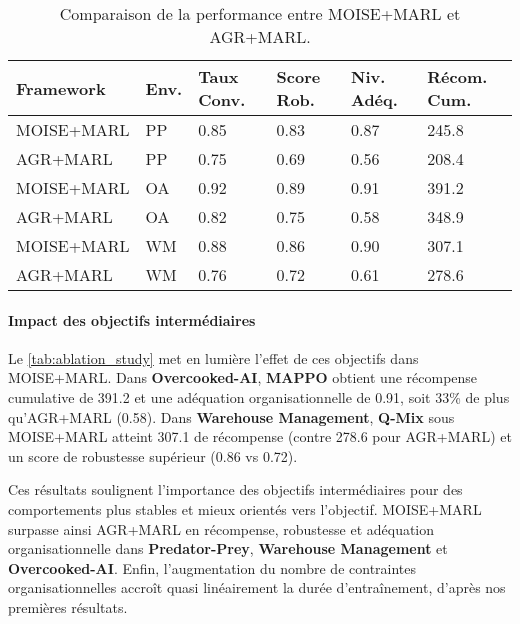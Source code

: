 \documentclass[final]{jfsma}
\begin{document}
\begin{table}[h!]
  \centering
  \caption{Comparaison de la performance entre MOISE+MARL et AGR+MARL.}
  \label{tab:ablation_study}
  \footnotesize
  \renewcommand{\arraystretch}{1.1}
  \begin{tabular}{p{2.1cm}p{0.5cm}p{0.7cm}p{0.7cm}p{0.6cm}p{0.9cm}}
    \hline
    \textbf{Framework} & \textbf{Env.} & \textbf{Taux Conv.} & \textbf{Score Rob.} & \textbf{Niv. Adéq.} & \textbf{Récom. Cum.} \\ \hline
    MOISE+MARL         & PP            & 0.85                & 0.83                & 0.87                & 245.8                \\
    AGR+MARL           & PP            & 0.75                & 0.69                & 0.56                & 208.4                \\
    MOISE+MARL         & OA            & 0.92                & 0.89                & 0.91                & 391.2                \\
    AGR+MARL           & OA            & 0.82                & 0.75                & 0.58                & 348.9                \\
    MOISE+MARL         & WM            & 0.88                & 0.86                & 0.90                & 307.1                \\
    AGR+MARL           & WM            & 0.76                & 0.72                & 0.61                & 278.6                \\ \hline
  \end{tabular}
\end{table}

\paragraph{Impact des objectifs intermédiaires}
Le \autoref{tab:ablation_study} met en lumière l’effet de ces objectifs dans MOISE+MARL. Dans \textbf{Overcooked-AI}, \textbf{MAPPO} obtient une récompense cumulative de 391.2 et une adéquation organisationnelle de 0.91, soit 33\% de plus qu’AGR+MARL (0.58). Dans \textbf{Warehouse Management}, \textbf{Q-Mix} sous MOISE+MARL atteint 307.1 de récompense (contre 278.6 pour AGR+MARL) et un score de robustesse supérieur (0.86 vs 0.72).

Ces résultats soulignent l’importance des objectifs intermédiaires pour des comportements plus stables et mieux orientés vers l’objectif. MOISE+MARL surpasse ainsi AGR+MARL en récompense, robustesse et adéquation organisationnelle dans \textbf{Predator-Prey}, \textbf{Warehouse Management} et \textbf{Overcooked-AI}.
%
Enfin, l’augmentation du nombre de contraintes organisationnelles accroît quasi linéairement la durée d’entraînement, d’après nos premières résultats\footnotemark[2].
\end{document}

